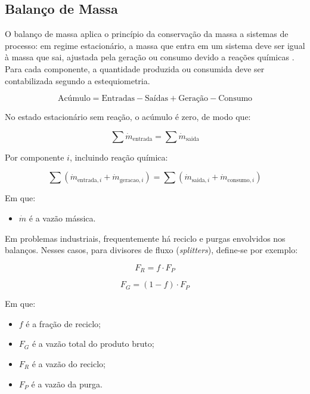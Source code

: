 \subsection{Balanço de Massa}

O balanço de massa aplica o princípio da conservação da massa a sistemas de processo: em regime estacionário, a massa que entra em um sistema deve ser igual à massa que sai, ajustada pela geração ou consumo devido a reações químicas \cite{felder2005}. Para cada componente, a quantidade produzida ou consumida deve ser contabilizada segundo a estequiometria.

\begin{equation}
\text{Acúmulo} = \text{Entradas} - \text{Saídas} + \text{Geração} - \text{Consumo}
\label{eq:mass_balance_word}
\end{equation}

No estado estacionário sem reação, o acúmulo é zero, de modo que:

\begin{equation}
\sum \dot{m}_{\mathrm{entrada}} = \sum \dot{m}_{\mathrm{saida}}
\label{eq:steady_state_mass_balance}
\end{equation}

Por componente $i$, incluindo reação química:

\begin{equation}
\sum \left(\dot{m}_{\mathrm{entrada},i} + \dot{m}_{\mathrm{geracao},i}\right) = \sum \left(\dot{m}_{\mathrm{saida},i} + \dot{m}_{\mathrm{consumo},i}\right)
\label{eq:component_mass_balance_rxn}
\end{equation}

Em que:
\begin{itemize}
    \item $\dot{m}$ é a vazão mássica.
\end{itemize}

Em problemas industriais, frequentemente há reciclo e purgas envolvidos nos balanços. Nesses casos, para divisores de fluxo (\textit{splitters}), define-se por exemplo:

\begin{equation}
F_{R} = f \cdot F_{P}
\label{eq:recycle_flow}
\end{equation}

\begin{equation}
F_{G} = ( 1 - f ) \cdot F_{P}
\label{eq:gross_product_flow}
\end{equation}

Em que:
\begin{itemize}
    \item $f$ é a fração de reciclo;
    \item $F_{G}$ é a vazão total do produto bruto;
    \item $F_{R}$ é a vazão do reciclo;
    \item $F_{P}$ é a vazão da purga.
\end{itemize}


